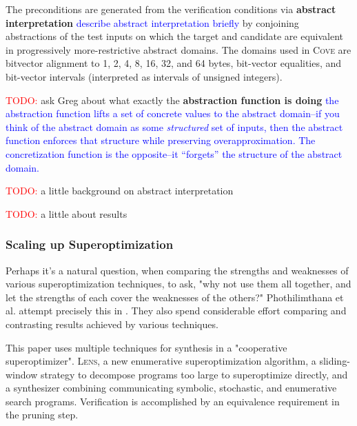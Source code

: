 \documentclass[12pt,twoside]{reedthesis}
\newcommand{\red}[1]{\textcolor{red}{#1}}
\newcommand{\comment}[2]{\textbf{#1} \textcolor{blue}{#2}}
\begin{document}
The preconditions are generated from the verification conditions via
    \comment{abstract interpretation}{describe abstract interpretation briefly}
    by conjoining abstractions of the test inputs on which the target and candidate are equivalent in progressively more-restrictive abstract domains.
The domains used in \textsc{Cove} are bitvector alignment to 1, 2, 4, 8, 16, 32, and 64 bytes, bit-vector equalities, and bit-vector intervals (interpreted as intervals of unsigned integers).
    
\red{TODO:} ask Greg about what exactly the \comment{abstraction function is doing}{the abstraction function lifts a set of concrete values to the abstract domain--if you think of the abstract domain as some \emph{structured} set of inputs, then the abstract function enforces that structure while preserving overapproximation. The concretization function is the opposite--it ``forgets'' the structure of the abstract domain.}
    
\red{TODO:} a little background on abstract interpretation
    
\red{TODO:} a little about results

\subsubsection{Scaling up Superoptimization}

Perhaps it's a natural question, when comparing the strengths and weaknesses of various superoptimization techniques, to ask, "why not use them all together, and let the strengths of each cover the weaknesses of the others?"
Phothilimthana et al. attempt precisely this in \cite{phothilimthana2016scaling}.
They also spend considerable effort comparing and contrasting results achieved by various techniques.
    
This paper uses multiple techniques for synthesis in a "cooperative superoptimizer".
\textsc{Lens}, a new enumerative superoptimization algorithm,
a sliding-window strategy to decompose programs too large to superoptimize directly,
and a synthesizer combining communicating symbolic, stochastic, and enumerative search programs.
Verification is accomplished by an equivalence requirement in the pruning step.
    
\end{document}
